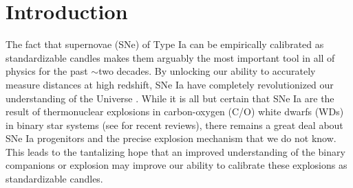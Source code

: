 \documentclass[twocolumn]{aastex63}
\begin{document}

\vspace{1em}

\section{Introduction}

The fact that supernovae (SNe) of Type Ia can be empirically calibrated as
standardizable candles makes them arguably the most important tool in all of
physics for the past $\sim$two decades. By unlocking our ability to accurately
measure distances at high redshift, SNe Ia have completely revolutionized our
understanding of the Universe \citep{Riess98,Perlmutter99}. While it is all
but certain that SNe Ia are the result of thermonuclear explosions in
carbon-oxygen (C/O) white dwarfs (WDs) in binary star systems (see
\citealt{Maoz14,Livio18} for recent reviews), there remains a great deal about
SNe Ia progenitors and the precise explosion mechanism that we do not know.
This leads to the tantalizing hope that an improved understanding of the
binary companions or explosion may improve our ability to calibrate these
explosions as standardizable candles.
\end{document}
